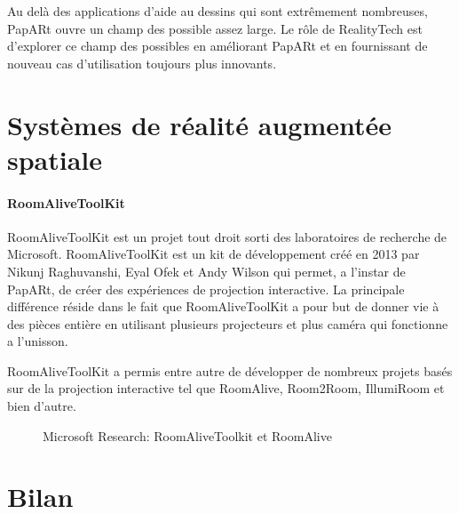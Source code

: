
Au delà des applications d'aide au dessins qui sont extrêmement nombreuses, PapARt ouvre un champ des possible assez large. Le rôle de RealityTech est d'explorer ce champ des possibles en améliorant PapARt et en fournissant de nouveau cas d'utilisation toujours plus innovants.



\section{Systèmes de réalité augmentée spatiale}
\label{sec:SARother}
\paragraph{RoomAliveToolKit} RoomAliveToolKit\cite{Jones:2014:RME:2642918.2647383} est un projet tout droit sorti des laboratoires de recherche de Microsoft. RoomAliveToolKit est un kit de développement créé en 2013 par Nikunj Raghuvanshi, Eyal Ofek et Andy Wilson qui permet, a l'instar de PapARt, de créer des expériences de projection interactive. La principale différence réside dans le fait que RoomAliveToolKit a pour but de donner vie à des pièces entière en utilisant plusieurs projecteurs et plus caméra qui fonctionne a l'unisson.

RoomAliveToolKit a permis entre autre de développer de nombreux projets basés sur de la projection interactive tel que RoomAlive, Room2Room, IllumiRoom et bien d'autre.

\begin{figure}[H]
    \centering
\caption{Microsoft Research: RoomAliveToolkit et RoomAlive\protect\footnotemark}
\label{fig:roomalive}
\end{figure}



\section{Bilan}